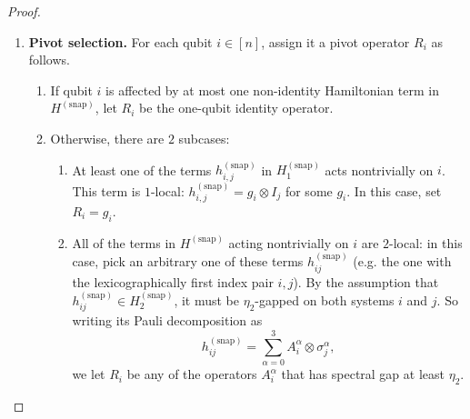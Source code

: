 \documentclass[a4paper,onecolumn,11pt]{quantumarticle}
\theoremstyle{plain}
\newcommand{\eps}{\varepsilon}
\newcommand{\snp}{{(\mathrm{snap})}}
\begin{document}
\begin{proof}
\begin{enumerate}
\begin{enumerate}
    \begin{enumerate}
        \item $H^\snp_2$ contains $2$-local terms such that each pair of terms $\eps_2$-commute.
        \item $H^\snp_1$ contains $1$-local terms such that each pair of terms $\eps_1$-commute. For two such terms overlapping on qubit $i$, write $h^\snp_{i,j}=\mathcal{S}_j(h_{i,j})$ and $h^\snp_{i,k}=\mathcal{S}_k(h_{i,k})$, where $j\neq k$. Then
        \[
            \|[h^\snp_{i,j},h^\snp_{i,k}]\|
            =\|\mathcal{S}_j\mathcal{S}_k([h_{i,j},h_{i,k}])\|
            \leq\eps=\eps_1.
        \]
        \item Any term in $H^\snp_2$ $\eps_1$-commutes with any term in $H^\snp_1$. Their commutator is zero unless they overlap on the qubit affected by the $1$-local term. For $h^\snp_{i,j}=h_{i,j}\in H^\snp_2$ and $h^\snp_{i,k}=\mathcal{S}_k(h_{i,k})\in H^\snp_1$, we have
        \[
            \|[h^\snp_{i,k},h^\snp_{i,j}]\|
            =\|\mathcal{S}_k([h_{i,k},h_{i,j}])\|
            \leq\eps=\eps_1.
        \]
    \end{enumerate}
    Terms in $H^\snp_0$ are scalar and commute with every term.
    \end{enumerate}
    \item \textbf{Pivot selection.} For each qubit $i \in [n]$, assign it a pivot operator $R_i$ as follows.
    \begin{enumerate}
        \item If qubit $i$ is affected by at most one non-identity Hamiltonian term in $H^\snp$, let $R_i$ be the one-qubit identity operator.
        \item Otherwise, there are $2$ subcases:
        \begin{enumerate}
            \item At least one of the terms $h^\snp_{i,j}$ in $H_1^\snp$ acts nontrivially on $i$. This term is $1$-local: $h^\snp_{i,j} = g_i \otimes I_j$ for some $g_i$. In this case, set $R_i = g_i$.
            \item All of the terms in $H^\snp$ acting nontrivially on $i$ are $2$-local: in this case, pick an arbitrary one of these terms $h^\snp_{ij}$ (e.g. the one with the lexicographically first index pair $i,j$). By the assumption that $h^\snp_{ij} \in H^\snp_2$, it must be $\eta_2$-gapped on both systems $i$ and $j$. So writing its Pauli decomposition as
            \[ h^\snp_{ij} = \sum_{\alpha = 0}^{3} A^\alpha_i \otimes \sigma^\alpha_j, \]
            we let $R_i$ be any of the operators $A^\alpha_i$ that has spectral gap at least $\eta_2$.
        \end{enumerate}


\end{enumerate}
\end{enumerate}
\end{proof}
\end{document}
